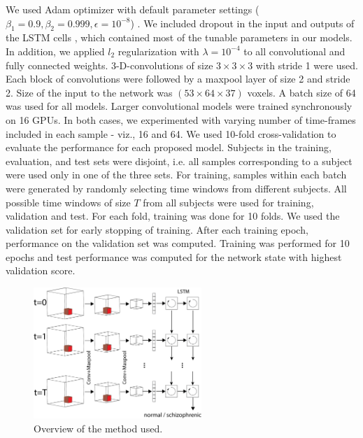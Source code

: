 \documentclass{article}
\begin{document}
We used Adam optimizer with default parameter settings ($\beta_1=0.9, \beta_2=0.999, \epsilon=10^{-8}$) \citep{Kingma2014}. We included dropout in the input and outputs of the LSTM cells \citep{Zaremba2014}, which contained most of the tunable parameters in our models. In addition, we applied $l_2$ regularization with $\lambda=10^{-4}$ to all convolutional and fully connected weights.
3-D-convolutions of size $3\times3\times3$ with stride 1 were used. Each block of convolutions were followed by a maxpool layer of size 2 and stride 2. Size of the input to the network was $(53\times64\times37)$ voxels. 
A batch size of 64 was used for all models. Larger convolutional models were trained synchronously on 16 GPUs. In both cases, we experimented with varying number of time-frames included in each sample - viz., 16 and 64.
We used 10-fold cross-validation to evaluate the performance for each proposed model. Subjects in the training, evaluation, and test sets were disjoint, i.e. all samples corresponding to a subject were used only in one of the three sets. For training, samples within each batch were generated by randomly selecting time windows from different subjects. All possible time windows of size $T$ from all subjects were used for training, validation and test. For each fold, training was done for 10 folds. We used the validation set for early stopping of training. After each training epoch, performance on the validation set was computed. Training was performed for 10 epochs and test performance was computed for the network state with highest validation score.



\begin{figure}[h]
\begin{center}
\includegraphics[width=2.5in]{figures/overview.png}
\end{center}
\caption{Overview of the method used.}
\label{fig1}
\end{figure}
\end{document}
